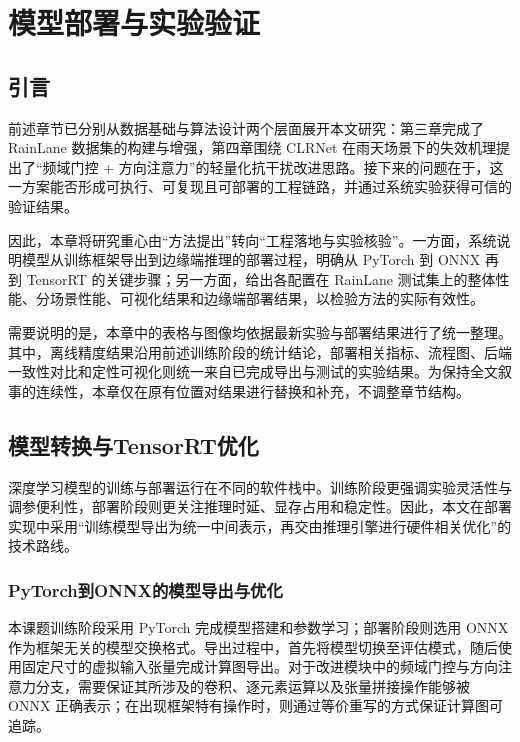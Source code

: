 \chapter{模型部署与实验验证}
\label{chap:deployment_exp}

\section{引言}
\label{sec:intro_de}

前述章节已分别从数据基础与算法设计两个层面展开本文研究：第三章完成了 RainLane 数据集的构建与增强，第四章围绕 CLRNet 在雨天场景下的失效机理提出了“频域门控 + 方向注意力”的轻量化抗干扰改进思路。接下来的问题在于，这一方案能否形成可执行、可复现且可部署的工程链路，并通过系统实验获得可信的验证结果。

因此，本章将研究重心由“方法提出”转向“工程落地与实验核验”。一方面，系统说明模型从训练框架导出到边缘端推理的部署过程，明确从 PyTorch 到 ONNX 再到 TensorRT 的关键步骤；另一方面，给出各配置在 RainLane 测试集上的整体性能、分场景性能、可视化结果和边缘端部署结果，以检验方法的实际有效性。

需要说明的是，本章中的表格与图像均依据最新实验与部署结果进行了统一整理。其中，离线精度结果沿用前述训练阶段的统计结论，部署相关指标、流程图、后端一致性对比和定性可视化则统一来自已完成导出与测试的实验结果。为保持全文叙事的连续性，本章仅在原有位置对结果进行替换和补充，不调整章节结构。

\section{模型转换与TensorRT优化}
\label{sec:model_conversion}

深度学习模型的训练与部署运行在不同的软件栈中。训练阶段更强调实验灵活性与调参便利性，部署阶段则更关注推理时延、显存占用和稳定性。因此，本文在部署实现中采用“训练模型导出为统一中间表示，再交由推理引擎进行硬件相关优化”的技术路线。

\subsection{PyTorch到ONNX的模型导出与优化}

本课题训练阶段采用 PyTorch 完成模型搭建和参数学习；部署阶段则选用 ONNX 作为框架无关的模型交换格式。导出过程中，首先将模型切换至评估模式，随后使用固定尺寸的虚拟输入张量完成计算图导出。对于改进模块中的频域门控与方向注意力分支，需要保证其所涉及的卷积、逐元素运算以及张量拼接操作能够被 ONNX 正确表示；在出现框架特有操作时，则通过等价重写的方式保证计算图可追踪。

